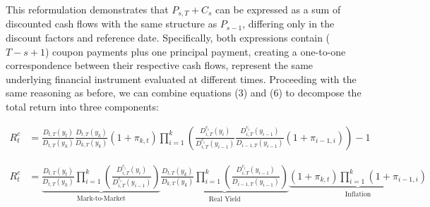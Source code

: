 \documentclass[10pt]{report}
\begin{document}
This reformulation demonstrates that $P_{s,T} + C_s$ can be expressed as a sum of discounted cash flows with the same structure as $P_{s-1}$, differing only in the discount factors and reference date. Specifically, both expressions contain ($T-s+1$) coupon payments plus one principal payment, creating a one-to-one correspondence between their respective cash flows, represent the same underlying financial instrument evaluated at different times. Proceeding with the same reasoning as before, we can combine equations (3) and (6) to decompose the total return into three components:

\begin{align*}
	R_{t}^{c} & = \frac{D_{t,T}(y_{t})}{D_{t,T}(y_{k})}  \frac{D_{t,T}(y_{k})}{D_{k,T}(y_{k})}  \left(1 + \pi_{k,t}\right)  \prod_{i=1}^{k}\left( \frac{D_{i,T}^{c_i}(y_{i})}{D_{i,T}^{c_i}(y_{i-1})}  \frac{D_{i,T}^{c_i}(y_{i-1})}{D_{i-1,T}(y_{i-1})}  \left(1 + \pi_{i-1,i}\right)\right) - 1
\end{align*}

\begin{align*}
	R_{t}^{c} & = \underbrace{\frac{D_{t,T}(y_{t})}{D_{t,T}(y_{k})}\prod_{i=1}^{k}\left( \frac{D_{i,T}^{c_i}(y_{i})}{D_{i,T}^{c_i}(y_{i-1})} \right)}_{\text{Mark-to-Market}} \underbrace{\frac{D_{t,T}(y_{k})}{D_{k,T}(y_{k})}\prod_{i=1}^{k}\left( \frac{D_{i,T}^{c_i}(y_{i-1})}{D_{i-1,T}(y_{i-1})} \right)}_{\text{Real Yield}} \underbrace{\left(1 + \pi_{k,t}\right) \prod_{i=1}^{k}\left(1 + \pi_{i-1,i}\right)}_{\text{Inflation}}
\end{align*}
\end{document}
